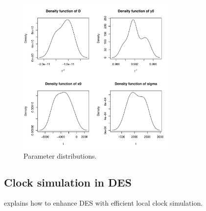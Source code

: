 \documentclass[11pt]{article}
\begin{document}
\begin{figure}[h!]
\centering
\includegraphics[width=0.70\textwidth]{pictures/parameters.pdf}
\caption{Parameter distributions.}
\label{fig:drift-noise}
\end{figure}

\subsection{Clock simulation in DES}

\cite{ring2010clock} explains how to enhance DES with efficient local clock simulation.

\newpage



\end{document}
